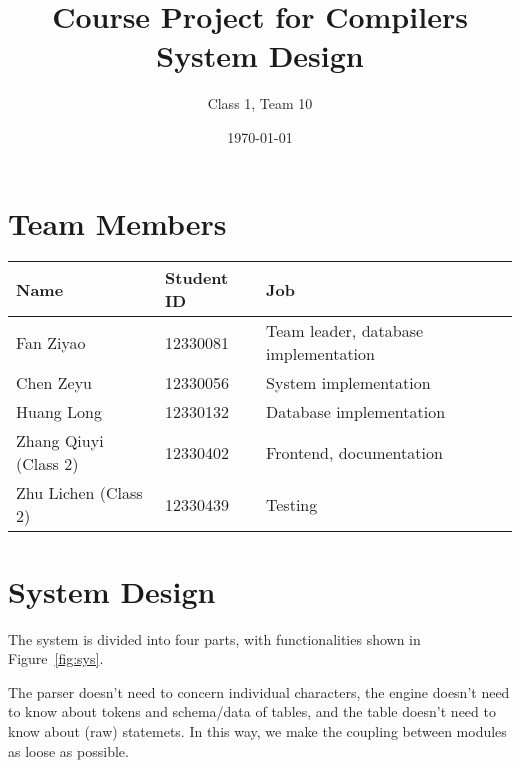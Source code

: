 \documentclass{article}
\begin{document}
\title{
Course Project for Compilers \\
System Design
}
\author{Class 1, Team 10}
\date{\today}
\maketitle
\tableofcontents
\section{Team Members}

\begin{table}[H]
\centering
\begin{tabular}{l l l}
Name & Student ID  & Job\\
\hline
Fan Ziyao & 12330081 & Team leader, database implementation\\
Chen Zeyu & 12330056 & System implementation \\
Huang Long & 12330132 & Database implementation \\
Zhang Qiuyi (Class 2) & 12330402 & Frontend, documentation \\
Zhu Lichen (Class 2) & 12330439 & Testing
\end{tabular}
\end{table}

\section{System Design}

The system is divided into four parts, with functionalities shown in Figure~\ref{fig:sys}.

The parser doesn't need to concern individual characters, the engine doesn't need to know about tokens and schema/data of tables, and the table doesn't need to know about (raw) statemets. In this way, we make the coupling between modules as loose as possible.
\end{document}
